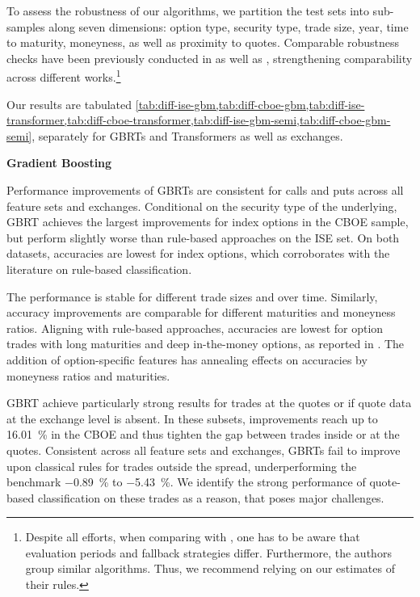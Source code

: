 To assess the robustness of our algorithms, we partition the test sets into sub-samples along seven dimensions: option type, security type, trade size, year, time to maturity, moneyness, as well as proximity to quotes. Comparable robustness checks have been previously conducted in \textcite[][47]{grauerOptionTradeClassification2022} as well as  \textcite[][890--892]{savickasInferringDirectionOption2003}, strengthening comparability across different works.\footnote{Despite all efforts, when comparing with \textcite[][47--52]{grauerOptionTradeClassification2022}, one has to be aware that evaluation periods and fallback strategies differ. Furthermore, the authors group similar algorithms. Thus, we recommend relying on our estimates of their rules.}

Our results are tabulated \cref{tab:diff-ise-gbm,tab:diff-cboe-gbm,tab:diff-ise-transformer,tab:diff-cboe-transformer,tab:diff-ise-gbm-semi,tab:diff-cboe-gbm-semi}, separately for \glspl{GBRT} and Transformers as well as exchanges.

\textbf{Gradient Boosting}

Performance improvements of \glspl{GBRT} are consistent for calls and puts across all feature sets and exchanges. Conditional on the security type of the underlying, \gls{GBRT} achieves the largest improvements for index options in the \gls{CBOE} sample, but perform slightly worse than rule-based approaches on the \gls{ISE} set. On both datasets, accuracies are lowest for index options, which corroborates with the literature on rule-based classification.

The performance is stable for different trade sizes and over time. Similarly, accuracy improvements are comparable for different maturities and moneyness ratios. Aligning with rule-based approaches, accuracies are lowest for option trades with long maturities and deep in-the-money options, as reported in \textcite[][22]{grauerOptionTradeClassification2022}. The addition of option-specific features has annealing effects on accuracies by moneyness ratios and maturities.

\gls{GBRT} achieve particularly strong results for trades at the quotes or if quote data at the exchange level is absent. In these subsets, improvements reach up to \SI{16.01}{\percent} in the \gls{CBOE} and thus tighten the gap between trades inside or at the quotes. Consistent across all feature sets and exchanges, \glspl{GBRT} fail to improve upon classical rules for trades outside the spread, underperforming the benchmark \SI{-0.89}{\percent} to \SI{-5.43}{\percent}. We identify the strong performance of quote-based classification on these trades as a reason, that poses major challenges.

